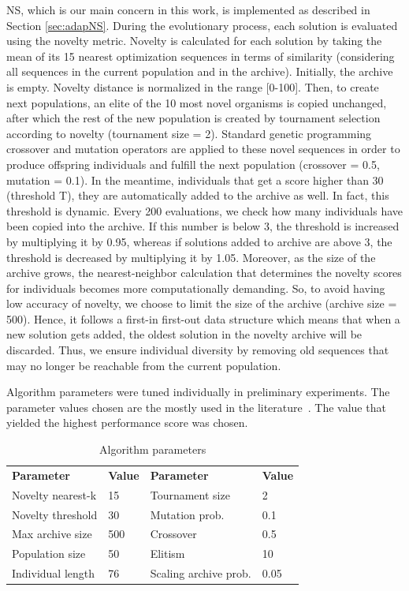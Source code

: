 NS, which is our main concern in this work, is implemented as described in Section \ref{sec:adapNS}. During the evolutionary process, each solution is evaluated using the novelty metric. Novelty is calculated for each solution by taking the mean of its 15 nearest optimization sequences in terms of similarity (considering all sequences in the current population and in the archive). Initially, the archive is empty. Novelty distance is normalized in the range [0-100].
Then, to create next populations, an elite of the 10 most novel organisms is copied unchanged, after which the rest of the new population is created by tournament selection according to novelty (tournament size = 2). Standard genetic programming crossover and mutation operators are applied to these novel sequences in order to produce offspring individuals and fulfill the next population (crossover = 0.5, mutation = 0.1).
In the meantime, individuals that get a score higher than 30 (threshold T), they are automatically added to the archive as well. 
In fact, this threshold is dynamic. Every 200 evaluations, we check how many individuals have been copied into the archive. If this number is below 3, the threshold is increased by multiplying it by 0.95, whereas if solutions added to archive are above 3, the threshold is decreased by multiplying it by 1.05. 
Moreover, as the size of the archive grows, the nearest-neighbor calculation that determines the novelty scores for individuals becomes more computationally demanding. So, to avoid having low accuracy of novelty, we choose to limit the size of the archive (archive size = 500). Hence, it follows a first-in first-out data structure which means that when a new solution gets added, the oldest solution in the novelty archive will be discarded. Thus, we ensure individual diversity by removing old sequences that may no longer be reachable from the current population.

Algorithm parameters were tuned individually in preliminary experiments. The parameter values chosen are the mostly used in the literature~\cite{inden2013examination,boussaa2015novelty}. The value that yielded the highest performance score was chosen.  

\begin{table}
	\centering
	\caption{Algorithm parameters}
	\begin{tabular}{| l |l| l |l| }\hline
		\textbf{Parameter} & \textbf{Value} & \textbf{Parameter} & \textbf{Value} \\	\hhline{|=|=|=|=|}	
		Novelty nearest-k  & 15 &  Tournament size & 2\\ 
		Novelty threshold & 30 &  Mutation prob. & 0.1\\  
		Max archive size & 500 &  Crossover & 0.5  \\  
		Population size & 50 & Elitism  & 10  \\  
		Individual length & 76 & Scaling archive prob. & 0.05   \\ 	\hline
  
	\end{tabular}
	\label{tab:Algorithm parameters}
\end{table}

